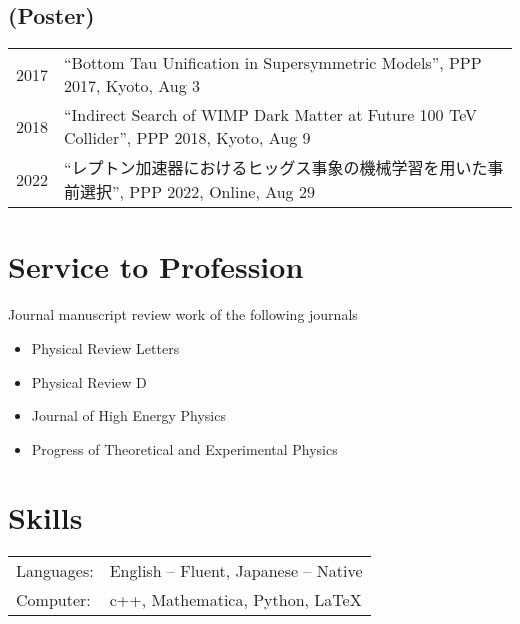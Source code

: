 \documentclass[12pt]{article}
\begin{document}
\subsection*{(Poster)}
\begin{table}[H]\begin{tabular}{lp{6in}}2017 & ``Bottom Tau Unification in Supersymmetric Models'', PPP 2017, Kyoto, Aug 3 \\2018 & ``Indirect Search of WIMP Dark Matter at Future 100 TeV Collider'', PPP 2018, Kyoto, Aug 9 \\2022 & ``レプトン加速器におけるヒッグス事象の機械学習を用いた事前選択'', PPP 2022, Online, Aug 29 \\\end{tabular}\end{table}

\section*{Service to Profession}
\vspace*{1em}
Journal manuscript review work of the following journals
\begin{itemize}
  \setlength\itemsep{0em}
  \item Physical Review Letters
  \item Physical Review D
  \item Journal of High Energy Physics
  \item Progress of Theoretical and Experimental Physics
\end{itemize}

\section*{Skills}
\begin{table}[H]
  \begin{tabular}{lp{6in}}
    Languages: & English -- Fluent, Japanese -- Native \\
    Computer: & c++, Mathematica, Python, LaTeX
  \end{tabular}
\end{table}
\end{document}
